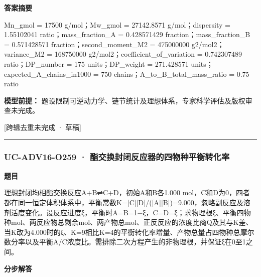 \documentclass[UTF8,11pt,a4paper]{ctexart}
\begin{document}
\noindent\textbf{答案摘要}\par
Mn\_gmol = 17500 g/mol；Mw\_gmol = 27142.8571 g/mol；dispersity = 1.55102041 ratio；mass\_fraction\_A = 0.428571429 fraction；mass\_fraction\_B = 0.571428571 fraction；second\_moment\_M2 = 475000000 g2/mol2；variance\_M2 = 168750000 g2/mol2；coefficient\_of\_variation = 0.742307489 ratio；DP\_number = 175 units；DP\_weight = 271.428571 units；expected\_A\_chains\_in1000 = 750 chains；A\_to\_B\_total\_mass\_ratio = 0.75 ratio\par
\noindent\textbf{模型前提：}
题设限制可逆动力学、链节统计及理想体系，专家科学评估及版权审查未完成。\par
\noindent\textcolor{red!65!black}{[跨辑去重未完成 · 草稿]} \par
\medskip\hrule\medskip
{}
\subsubsection*{UC-ADV16-O259 · 酯交换封闭反应器的四物种平衡转化率}
\noindent\textbf{题目}\par
理想封闭均相酯交换反应A+B⇌C+D，初始A和B各1.000 mol，C和D为0，四者都在同一恒定体积体系中，平衡常数K=[C][D]/([A][B])=9.000，忽略副反应及溶剂活度变化。设反应进度ξ，平衡时A=B=1−ξ，C=D=ξ；求物理根ξ、平衡四物种mol、两反应物总剩余mol、两产物总mol、正反反应的浓度比商Q及其与K差、当K改为4.000时的ξ、K=9相比K=4的平衡转化率增量、产物总量占四物种总摩尔数分率以及平衡A/C浓度比。需排除二次方程产生的非物理根，并保证ξ在0至1之间。\par
\medskip\noindent\textbf{分步解答}
\end{document}
